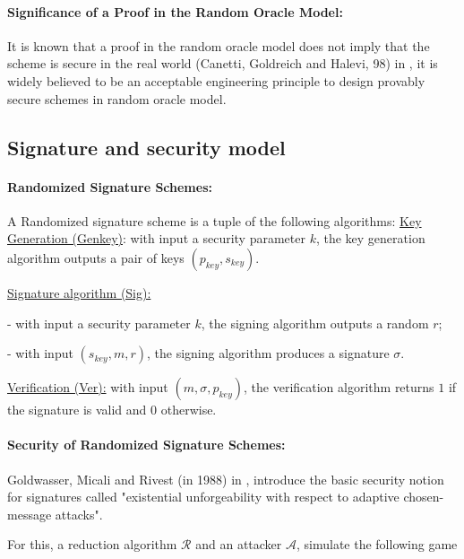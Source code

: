 \documentclass[a4paper,11pt]{article}
\begin{document}
\vspace{0.2cm}

\paragraph{Significance of a Proof in the Random Oracle Model:}

It is known that a proof in the random oracle model does not imply that the scheme is secure in the real
world (Canetti, Goldreich and Halevi,  98) in \cite{Canetti}, it is  widely believed to be an acceptable engineering principle to design provably secure schemes in random oracle model.

\subsection{Signature and security model}\label{sec:one:2}

 \paragraph{Randomized Signature Schemes:}
 
 A Randomized signature scheme is a tuple of the following algorithms:
\underline{Key Generation (Genkey)}: with input a security parameter $k$, the key generation algorithm outputs a pair of keys $(p_{key}, s_{key})$.


\underline{Signature algorithm (Sig):}

- with input a security parameter $k$, the signing algorithm outputs a random $r$;

- with input $(s_{key}, m,r)$, the signing algorithm  produces a signature $\sigma$.

\underline{Verification (Ver):}  with input $(m, \sigma, p_{key})$, the verification algorithm returns $1$ if the signature is valid and $0$ otherwise.



\paragraph{Security of Randomized Signature Schemes:}

Goldwasser, Micali and Rivest (in 1988)  in \cite{Goldwasser}, introduce the basic security notion for signatures called "existential unforgeability with respect to adaptive chosen-message attacks".

For this, a reduction algorithm $\mathcal{R}$ and an attacker $\mathcal{A}$, simulate the following game
\end{document}
